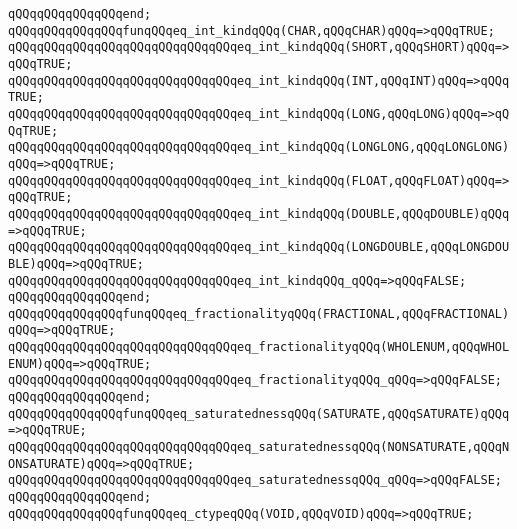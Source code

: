 \verb|qQQqqQQqqQQqqQQqend;|\newline
\newline
\verb|qQQqqQQqqQQqqQQqfunqQQqeq_int_kindqQQq(CHAR,qQQqCHAR)qQQq=>qQQqTRUE;|\newline
\verb|qQQqqQQqqQQqqQQqqQQqqQQqqQQqqQQqeq_int_kindqQQq(SHORT,qQQqSHORT)qQQq=>qQQqTRUE;|\newline
\verb|qQQqqQQqqQQqqQQqqQQqqQQqqQQqqQQqeq_int_kindqQQq(INT,qQQqINT)qQQq=>qQQqTRUE;|\newline
\verb|qQQqqQQqqQQqqQQqqQQqqQQqqQQqqQQqeq_int_kindqQQq(LONG,qQQqLONG)qQQq=>qQQqTRUE;|\newline
\verb|qQQqqQQqqQQqqQQqqQQqqQQqqQQqqQQqeq_int_kindqQQq(LONGLONG,qQQqLONGLONG)qQQq=>qQQqTRUE;|\newline
\verb|qQQqqQQqqQQqqQQqqQQqqQQqqQQqqQQqeq_int_kindqQQq(FLOAT,qQQqFLOAT)qQQq=>qQQqTRUE;|\newline
\verb|qQQqqQQqqQQqqQQqqQQqqQQqqQQqqQQqeq_int_kindqQQq(DOUBLE,qQQqDOUBLE)qQQq=>qQQqTRUE;|\newline
\verb|qQQqqQQqqQQqqQQqqQQqqQQqqQQqqQQqeq_int_kindqQQq(LONGDOUBLE,qQQqLONGDOUBLE)qQQq=>qQQqTRUE;|\newline
\verb|qQQqqQQqqQQqqQQqqQQqqQQqqQQqqQQqeq_int_kindqQQq_qQQq=>qQQqFALSE;|\newline
\verb|qQQqqQQqqQQqqQQqend;|\newline
\newline
\verb|qQQqqQQqqQQqqQQqfunqQQqeq_fractionalityqQQq(FRACTIONAL,qQQqFRACTIONAL)qQQq=>qQQqTRUE;|\newline
\verb|qQQqqQQqqQQqqQQqqQQqqQQqqQQqqQQqeq_fractionalityqQQq(WHOLENUM,qQQqWHOLENUM)qQQq=>qQQqTRUE;|\newline
\verb|qQQqqQQqqQQqqQQqqQQqqQQqqQQqqQQqeq_fractionalityqQQq_qQQq=>qQQqFALSE;|\newline
\verb|qQQqqQQqqQQqqQQqend;|\newline
\newline
\verb|qQQqqQQqqQQqqQQqfunqQQqeq_saturatednessqQQq(SATURATE,qQQqSATURATE)qQQq=>qQQqTRUE;|\newline
\verb|qQQqqQQqqQQqqQQqqQQqqQQqqQQqqQQqeq_saturatednessqQQq(NONSATURATE,qQQqNONSATURATE)qQQq=>qQQqTRUE;|\newline
\verb|qQQqqQQqqQQqqQQqqQQqqQQqqQQqqQQqeq_saturatednessqQQq_qQQq=>qQQqFALSE;|\newline
\verb|qQQqqQQqqQQqqQQqend;|\newline
\newline
\verb|qQQqqQQqqQQqqQQqfunqQQqeq_ctypeqQQq(VOID,qQQqVOID)qQQq=>qQQqTRUE;|\newline
